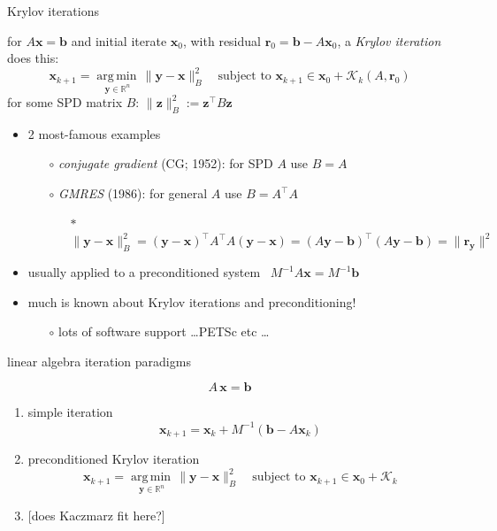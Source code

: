 \documentclass[usepdftitle=false,usenames,dvipsnames]{beamer}
\newcommand{\RR}{\mathbb{R}}
\newcommand{\argmin}[1]{\underset{#1}{\operatorname{arg\, min}\,}}
\newcommand{\bb}{\mathbf{b}}
\newcommand{\br}{\mathbf{r}}
\newcommand{\bx}{\mathbf{x}}
\newcommand{\by}{\mathbf{y}}
\newcommand{\bz}{\mathbf{z}}
\begin{document}
\begin{frame}{Krylov iterations}

\begin{definition} for $A\bx = \bb$ and initial iterate $\bx_0$, with residual $\br_0=\bb-A\bx_0$, a \emph{Krylov iteration} does this:
    $$\bx_{k+1} = \argmin{\by \in \RR^n} \|\by - \bx\|_B^2 \quad \text{subject to } \bx_{k+1} \in \bx_0+\mathcal{K}_{k}(A,\br_0)$$
for some SPD matrix $B$: \quad $\|\bz\|_B^2 := \bz^\top B \bz$
\end{definition}

\begin{itemize}
\item 2 most-famous examples
    \begin{itemize}
    \item[$\circ$] \emph{conjugate gradient} (CG; 1952): for SPD $A$ use $B=A$

    \medskip
    \item[$\circ$] \emph{GMRES} (1986): for general $A$ use $B=A^\top A$
        \begin{itemize}
        \item[{\color{black} $\ast$}] $\|\by - \bx\|_B^2 = (\by - \bx)^\top A^\top A (\by - \bx) = (A\by - \bb)^\top (A\by-\bb) = \|\br_{\by}\|^2$
        \end{itemize}
    \end{itemize}
\item usually applied to a preconditioned system \, $M^{-1}A \bx = M^{-1} \bb$
\item much is known about Krylov iterations and preconditioning!
    \begin{itemize}
    \item[$\circ$] lots of software support \dots PETSc etc \dots
    \end{itemize}
\end{itemize}
\end{frame}


\begin{frame}{linear algebra iteration paradigms}

$$A\,\bx = \bb$$

\begin{enumerate}
\item \alert{simple iteration}
    $$\bx_{k+1} = \bx_k + M^{-1} \left(\bb - A \bx_k\right)$$
\item \alert{preconditioned Krylov iteration}
    $$\bx_{k+1} = \argmin{\by \in \RR^n} \|\by - \bx\|_B^2 \quad \text{subject to } \bx_{k+1} \in \bx_0 + \mathcal{K}_{k}$$
\item {\Large [does Kaczmarz fit here?]}
\end{enumerate}
\end{frame}
\end{document}
